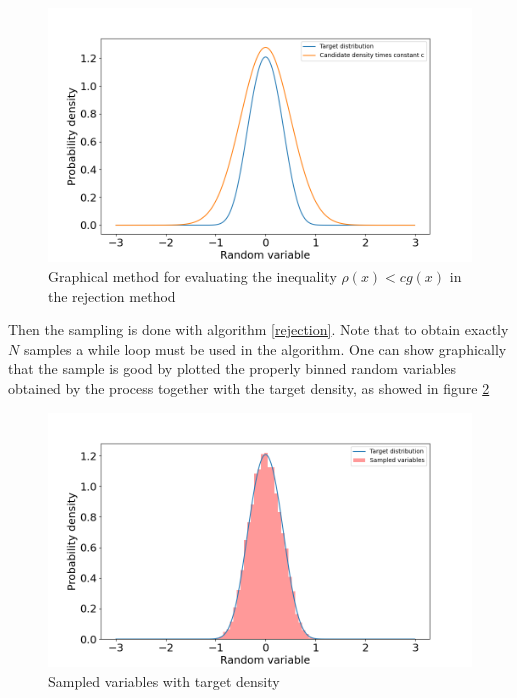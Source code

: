 \begin{figure}[t!]
\centering
\includegraphics[width=1\textwidth]{FIG/exercise_2_images/rejection_sampling_inequality_check.png}
\caption{Graphical method for evaluating the inequality $\rho(x)< cg(x)$ in the rejection method}
\label{chapter2_rej_ineq}
\end{figure}

Then the sampling is done with algorithm \ref{rejection}. Note that to obtain exactly $N$ samples a while loop must be used in the algorithm. 
One can show graphically that the sample is good by plotted the properly binned random variables obtained by the process together with the 
target density, as showed in figure \ref{chapter2_rej_variables}

\begin{figure}[t!]
\centering
\includegraphics[width=1\textwidth]{FIG/exercise_2_images/rejection_sampling_verify.png}
\caption{Sampled variables with target density}
\label{chapter2_rej_variables}
\end{figure}
        



